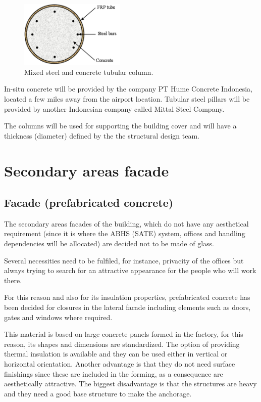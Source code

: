 		\begin{figure}[H]
\centering
\includegraphics[width=5cm]{./images/Facade/columns}
\caption{Mixed steel and concrete tubular column.}
\end{figure}

In-situ concrete will be provided by the company PT Hume Concrete Indonesia, located a few miles away from the airport location. Tubular steel pillars will be provided by another Indonesian company called Mittal Steel Company.

The columns will be used for supporting the building cover and will have a thickness (diameter) defined by the the structural design team.
	
	
	\section{Secondary areas facade}
		\subsection{Facade (prefabricated concrete)}
	The secondary areas facades of the building, which do not have any aesthetical requirement (since it is where the ABHS (SATE) system, offices and handling dependencies will be allocated) are decided not to be made of glass. 
	
	Several necessities need to be fulfiled, for instance, privacity of the offices but always trying to search for an attractive appearance for the people who will work there. 
	
	For this reason and also for its insulation properties, prefabricated concrete has been decided for closures in the lateral facade including elements such as doors, gates and windows where required.
	
	This material is based on large concrete panels formed in the factory, for this reason, its shapes and dimensions are standardized. The option of providing thermal insulation is available and they can be used either in vertical or horizontal orientation. Another advantage is that they do not need surface finishings since these are included in the forming, as a consequence are aesthetically attractive. The biggest disadvantage is that the structures are heavy and they need a good base structure to make the anchorage.
	
